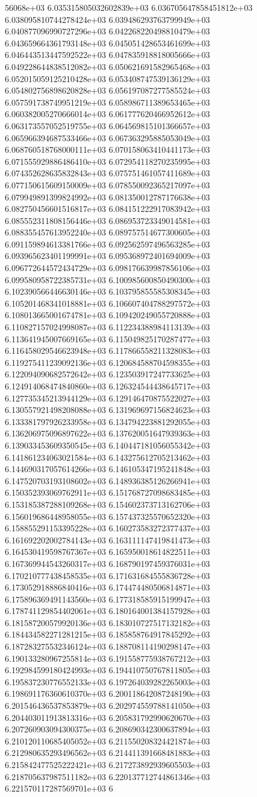 56068e+03	6.035315805032602839e+03	6.036705647858451812e+03	6.038095810744278424e+03	6.039486293763799949e+03	6.040877096990727296e+03	6.042268220498810479e+03	6.043659664361793148e+03	6.045051428653461699e+03	6.046443513447592522e+03	6.047835918818005666e+03	6.049228644838512082e+03	6.050621691582965468e+03	6.052015059125210428e+03	6.053408747539136129e+03	6.054802756898620828e+03	6.056197087277585524e+03	6.057591738749951219e+03	6.058986711389653465e+03	6.060382005270666014e+03	6.061777620466952612e+03	6.063173557052519755e+03	6.064569815101366657e+03	6.065966394687533466e+03	6.067363295885053049e+03	6.068760518768000111e+03	6.070158063410441173e+03	6.071555929886486410e+03	6.072954118270235995e+03	6.074352628635832843e+03	6.075751461057411689e+03	6.077150615609150009e+03	6.078550092365217097e+03	6.079949891399824992e+03	6.081350012787176638e+03	6.082750456601516817e+03	6.084151222917083942e+03	6.085552311808156446e+03	6.086953723349014581e+03	6.088355457613952240e+03	6.089757514677300605e+03	6.091159894613381766e+03	6.092562597496563285e+03	6.093965623401199991e+03	6.095368972401694009e+03	6.096772644572434729e+03	6.098176639987856106e+03	6.099580958722385731e+03	6.100985600850490300e+03	6.102390566446630146e+03	6.103795855585308345e+03	6.105201468341018881e+03	6.106607404788297572e+03	6.108013665001674781e+03	6.109420249055720888e+03	6.110827157024998087e+03	6.112234388984113139e+03	6.113641945007669165e+03	6.115049825170287477e+03	6.116458029546623948e+03	6.117866558211328083e+03	6.119275411239092136e+03	6.120684588704598355e+03	6.122094090682572642e+03	6.123503917247733625e+03	6.124914068474840860e+03	6.126324544438645717e+03	6.127735345213944129e+03	6.129146470875522027e+03	6.130557921498208088e+03	6.131969697156824623e+03	6.133381797926233958e+03	6.134794223881292055e+03	6.136206975096897622e+03	6.137620051647939363e+03	6.139033453609350545e+03	6.140447181056055342e+03	6.141861234063021584e+03	6.143275612705213462e+03	6.144690317057614266e+03	6.146105347195241848e+03	6.147520703193108602e+03	6.148936385126266941e+03	6.150352393069762911e+03	6.151768727098683485e+03	6.153185387288109268e+03	6.154602373713162706e+03	6.156019686448958055e+03	6.157437325570652320e+03	6.158855291153395228e+03	6.160273583272377437e+03	6.161692202002784143e+03	6.163111147419841473e+03	6.164530419598767367e+03	6.165950018614822511e+03	6.167369944543260317e+03	6.168790197459376031e+03	6.170210777438458535e+03	6.171631684555836728e+03	6.173052918886840416e+03	6.174474480506814871e+03	6.175896369491143560e+03	6.177318585915199947e+03	6.178741129854402061e+03	6.180164001384157928e+03	6.181587200579920136e+03	6.183010727517132182e+03	6.184434582271281215e+03	6.185858764917845292e+03	6.187283275532346124e+03	6.188708114190298147e+03	6.190133280967255814e+03	6.191558775938767212e+03	6.192984599180424993e+03	6.194410750767811805e+03	6.195837230776552133e+03	6.197264039282265003e+03	6.198691176360610370e+03	6.200118642087248190e+03	6.201546436537853879e+03	6.202974559788141050e+03	6.204403011913813316e+03	6.205831792990620670e+03	6.207260903094300375e+03	6.208690342300637894e+03	6.210120110685405052e+03	6.211550208324421874e+03	6.212980635293496562e+03	6.214411391668481883e+03	6.215842477525222421e+03	6.217273892939605503e+03	6.218705637987511182e+03	6.220137712744861346e+03	6.221570117287569701e+03	6
